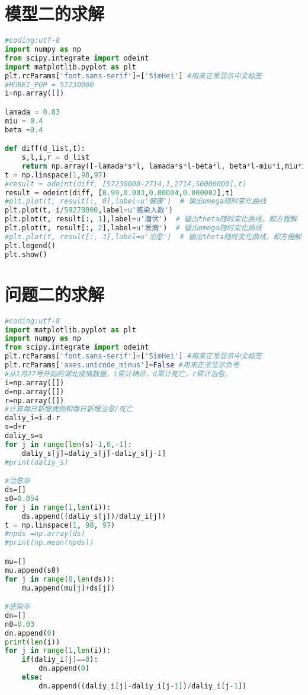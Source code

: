 \documentclass[withoutpreface,bwprint]{cumcmthesis} %
\begin{document}
\begin{appendices}
\section{模型二的求解}
\begin{lstlisting}[language=python]
#coding:utf-8
import numpy as np
from scipy.integrate import odeint
import matplotlib.pyplot as plt
plt.rcParams['font.sans-serif']=['SimHei'] #用来正常显示中文标签
#HUBEI_POP = 57230000
i=np.array([])

lamada = 0.03
miu = 0.4
beta =0.4

def diff(d_list,t):
    s,l,i,r = d_list
    return np.array([-lamada*s*l, lamada*s*l-beta*l, beta*l-miu*i,miu*i])
t = np.linspace(1,98,97)
#result = odeint(diff, [57230000-2714,1,2714,50000000],t)
result = odeint(diff, [0.99,0.003,0.00004,0.000002],t)
#plt.plot(t, result[:, 0],label=u'健康')  # 输出omega随时变化曲线
plt.plot(t, i/59270000,label=u'感染人数')
plt.plot(t, result[:, 1],label=u'潜伏')  # 输出theta随时变化曲线，即方程解
plt.plot(t, result[:, 2],label=u'发病')  # 输出omega随时变化曲线
#plt.plot(t, result[:, 3],label=u'治愈')  # 输出theta随时变化曲线，即方程解
plt.legend()
plt.show()
 \end{lstlisting}
 \section{问题二的求解}
\begin{lstlisting}[language=python]
#coding:utf-8
import matplotlib.pyplot as plt
import numpy as np
from scipy.integrate import odeint
plt.rcParams['font.sans-serif']=['SimHei'] #用来正常显示中文标签
plt.rcParams['axes.unicode_minus']=False #用来正常显示负号
#从1月27号开始的湖北疫情数据，i累计确诊，d累计死亡，r累计治愈。
i=np.array([])
d=np.array([])
r=np.array([])
#计算每日新增病例和每日新增治愈/死亡
daliy_i=i-d-r
s=d+r
daliy_s=s
for j in range(len(s)-1,0,-1):
    daliy_s[j]=daliy_s[j]-daliy_s[j-1]
#print(daliy_s)

#治愈率
ds=[]
s0=0.054
for j in range(1,len(i)):
    ds.append((daliy_s[j])/daliy_i[j])
t = np.linspace(1, 98, 97)
#npds =np.array(ds)
#print(np.mean(npds))

mu=[]
mu.append(s0)
for j in range(0,len(ds)):
    mu.append(mu[j]+ds[j])

#感染率
dn=[]
n0=0.03
dn.append(0)
print(len(i))
for j in range(1,len(i)):
    if(daliy_i[j]==0):
        dn.append(0)
    else:
        dn.append((daliy_i[j]-daliy_i[j-1])/daliy_i[j-1])


\end{lstlisting}
\end{appendices}
\end{document}

